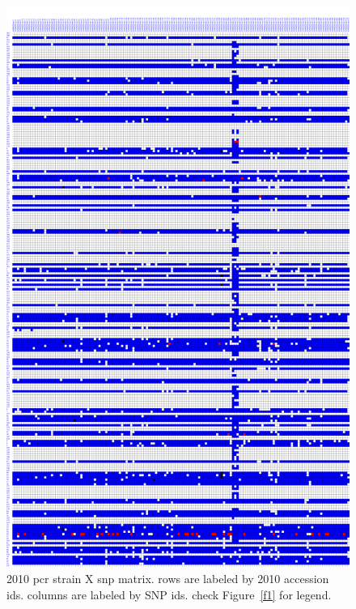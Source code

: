 \documentclass[a4paper,10pt]{article}
\begin{document}
\begin{figure}
\includegraphics[width=1\textwidth,height=1\textheight]{figures/2010pcr_with_sequenom_149snps_accession2ecotype_complete_y3.png}
\caption{2010 pcr strain X snp matrix. rows are labeled by 2010 accession ids. columns are labeled by SNP ids. check Figure~\ref{f1} for legend.}\label{f2}
\end{figure}
\end{document}
